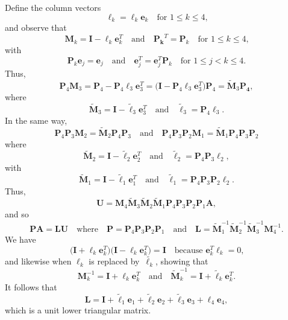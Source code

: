 Define the column vectors
\[
\boldsymbol{\ell}_k=\ell_k\boldsymbol{e}_k
\quad\text{for $1\le k\le 4$,}
\]
and observe that
\[
\boldsymbol{M}_k=\boldsymbol{I}-\boldsymbol{\ell}_k\boldsymbol{e}_k^T
\quad\text{and}\quad
\boldsymbol{P_k}^T=\boldsymbol{P}_k
\quad\text{for $1\le k\le 4$,}
\]
with
\[
\boldsymbol{P}_k\boldsymbol{e}_j=\boldsymbol{e}_j
\quad\text{and}\quad
\boldsymbol{e}_j^T=\boldsymbol{e}_j^T\boldsymbol{P}_k
\quad\text{for $1\le j<k\le 4$.}
\]
Thus,
\[
\boldsymbol{P}_4\boldsymbol{M}_3
	=\boldsymbol{P}_4-\boldsymbol{P}_4\boldsymbol{\ell}_3\boldsymbol{e}_3^T
	=\bigl(\boldsymbol{I}-\boldsymbol{P}_4\boldsymbol{\ell}_3\boldsymbol{e}_3^T
	\bigr)\boldsymbol{P}_4
	=\widetilde{\boldsymbol{M}}_3\boldsymbol{P_4},
\]
where
\[
\widetilde{\boldsymbol{M}}_3
	=\boldsymbol{I}-\tilde{\boldsymbol{\ell}}_3\boldsymbol{e}_3^T
\quad\text{and}\quad
\tilde{\boldsymbol{\ell}}_3=\boldsymbol{P}_4\boldsymbol{\ell}_3.
\]
In the same way,
\[
\boldsymbol{P}_4\boldsymbol{P}_3\boldsymbol{M}_2
=\widetilde{\boldsymbol{M}}_2\boldsymbol{P}_4\boldsymbol{P}_3
\quad\text{and}\quad
\boldsymbol{P}_4\boldsymbol{P}_3\boldsymbol{P}_2\boldsymbol{M}_1
=\widetilde{\boldsymbol{M}}_1\boldsymbol{P}_4\boldsymbol{P}_3\boldsymbol{P}_2
\]
where
\[
\widetilde{\boldsymbol{M}}_2
	=\boldsymbol{I}-\tilde{\boldsymbol{\ell}}_2\boldsymbol{e}_2^T
\quad\text{and}\quad
\tilde{\boldsymbol{\ell}}_2=\boldsymbol{P}_4\boldsymbol{P}_3\boldsymbol{\ell}_2,
\]
with
\[
\widetilde{\boldsymbol{M}}_1
	=\boldsymbol{I}-\tilde{\boldsymbol{\ell}}_1\boldsymbol{e}_1^T
\quad\text{and}\quad
\tilde{\boldsymbol{\ell}}_1
	=\boldsymbol{P}_4\boldsymbol{P}_3\boldsymbol{P}_2\boldsymbol{\ell}_2.
\]
Thus,
\[
\boldsymbol{U}=\boldsymbol{M}_4\widetilde{\boldsymbol{M}}_3
\widetilde{\boldsymbol{M}}_2\widetilde{\boldsymbol{M}}_1
\boldsymbol{P}_4\boldsymbol{P}_3\boldsymbol{P}_2\boldsymbol{P}_1
\boldsymbol{A},
\]
and so
\[
\boldsymbol{P}\boldsymbol{A}=\boldsymbol{L}\boldsymbol{U}
\quad\text{where}\quad
\boldsymbol{P}=\boldsymbol{P}_4\boldsymbol{P}_3\boldsymbol{P}_2\boldsymbol{P}_1
\quad\text{and}\quad
\boldsymbol{L}=\widetilde{\boldsymbol{M}}_1^{-1}
\widetilde{\boldsymbol{M}}_2^{-1}\widetilde{\boldsymbol{M}}_3^{-1}
\boldsymbol{M}_4^{-1}.
\]
We have
\[
\bigl(\boldsymbol{I}+\boldsymbol{\ell}_k\boldsymbol{e}_k^T\bigr)
\bigl(\boldsymbol{I}-\boldsymbol{\ell}_k\boldsymbol{e}_k^T\bigr)
=\boldsymbol{I}\quad\text{because $\boldsymbol{e}_k^T\boldsymbol{\ell}_k=0$,}
\]
and likewise when $\boldsymbol{\ell}_k$ is replaced 
by~$\tilde{\boldsymbol{\ell}_k}$, showing that
\[
\boldsymbol{M}_k^{-1}=
\boldsymbol{I}+\boldsymbol{\ell}_k\boldsymbol{e}_k^T
\quad\text{and}\quad
\widetilde{\boldsymbol{M}}_k^{-1}=
\boldsymbol{I}+\tilde{\boldsymbol{\ell}}_k\boldsymbol{e}_k^T.
\]
It follows that
\[
\boldsymbol{L}=\boldsymbol{I}+\tilde{\boldsymbol{\ell}}_1\boldsymbol{e}_1
+\tilde{\boldsymbol{\ell}}_2\boldsymbol{e}_2
+\tilde{\boldsymbol{\ell}}_3\boldsymbol{e}_3
+\boldsymbol{\ell}_4\boldsymbol{e}_4,
\]
which is a unit lower triangular matrix.

